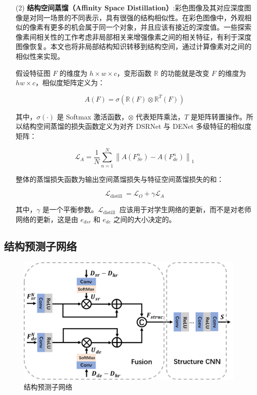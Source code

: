 \documentclass{vip-theme}
\begin{document}
\begin{sloppypar}
\begin{enumerate}
\item[(2)] \textbf{结构空间蒸馏（Affinity Space Distillation）}:彩色图像及其对应深度图像是对同一场景的不同表示，具有很强的结构相似性。在彩色图像中，外观相似的像素有更多的机会属于同一个对象，并且应该有接近的深度值。一些探索像素间相关性的工作考虑非局部相关来增强像素之间的相关特征，有利于深度图像恢复。本文也将非局部结构知识转移到结构空间，通过计算像素对之间的相似性来实现。

假设特征图 $F$ 的维度为 $h \times w \times c$，变形函数 $\mathbb{R}$ 的功能就是改变 $F$ 的维度为  $hw \times c$，相似度矩阵定义为：

\begin{equation}
A(F)=\sigma\left(\mathbb{R}(F) \otimes \mathbb{R}^{T}(F)\right)
\end{equation}

其中，$\sigma(\cdot)$ 是 Softmax 激活函数，$\otimes$ 代表矩阵乘法，$T$ 是矩阵转置操作。所以结构空间蒸馏的损失函数定义为对齐 DSRNet 与 DENet 多级特征的相似度矩阵：

\begin{equation}
\mathcal{L}_{A}=\frac{1}{N} \sum_{n=1}^{N}\left\|A\left(F_{S r}^{n}\right)-A\left(F_{d e}^{n}\right)\right\|_{1}
\end{equation}

整体的蒸馏损失函数为输出空间蒸馏损失与特征空间蒸馏损失的和：

\begin{equation}
\mathcal{L}_{\text {distill }}=\mathcal{L}_{O}+\gamma \mathcal{L}_{A}
\end{equation}

其中，$\gamma$ 是一个平衡参数。$\mathcal{L}_{\text {distill }}$ 应该用于对学生网络的更新，而不是对老师网络的更新，这是由 $e_{dsr}$ 和 $e_{de}$ 之间的大小决定的。

\end{enumerate}

\subsection{结构预测子网络}	

\begin{figure}
	\centering
	\centerline{\includegraphics[width=0.65\linewidth]{figure/gradient_block4.png}}
	\caption{结构预测子网络}
	\label{fig:block}
\end{figure}


\end{sloppypar}
\end{document}
